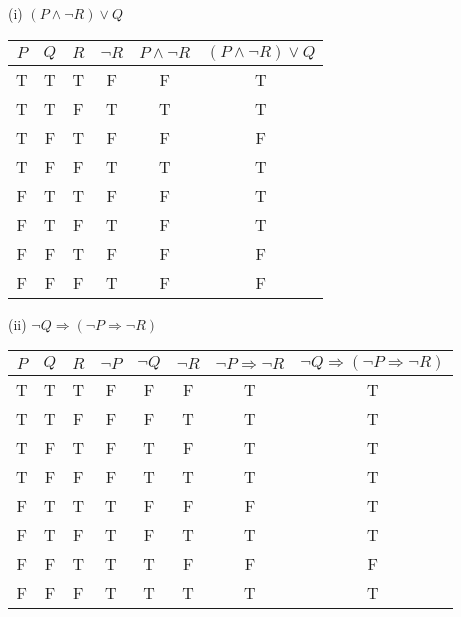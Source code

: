 \documentclass{article}
\begin{document}
(i) $(P \land \neg R) \lor Q$\\
\begin{tabular}{|c|c|c|c|c|c|}
    \hline
    $P$ & $Q$ & $R$ & $\neg R$ & $ P \land \neg R$ & $(P \land \neg R) \lor Q$ \\
    \hline
    T   & T   & T   & F        & F                 & T                         \\
    T   & T   & F   & T        & T                 & T                         \\
    T   & F   & T   & F        & F                 & F                         \\
    T   & F   & F   & T        & T                 & T                         \\
    F   & T   & T   & F        & F                 & T                         \\
    F   & T   & F   & T        & F                 & T                         \\
    F   & F   & T   & F        & F                 & F                         \\
    F   & F   & F   & T        & F                 & F                         \\
    \hline
\end{tabular}

(ii) $\neg Q \Rightarrow (\neg P \Rightarrow \neg R)$\\
\begin{tabular}{|c|c|c|c|c|c|c|c|}
    \hline
    $P$ & $Q$ & $R$ & $\neg P $ & $\neg Q$ & $\neg R$ & $\neg P \Rightarrow \neg R $ & $\neg Q \Rightarrow (\neg P \Rightarrow \neg R)$ \\
    \hline
    T   & T   & T   & F         & F        & F        & T                            & T                                                \\
    T   & T   & F   & F         & F        & T        & T                            & T                                                \\
    T   & F   & T   & F         & T        & F        & T                            & T                                                \\
    T   & F   & F   & F         & T        & T        & T                            & T                                                \\
    F   & T   & T   & T         & F        & F        & F                            & T                                                \\
    F   & T   & F   & T         & F        & T        & T                            & T                                                \\
    F   & F   & T   & T         & T        & F        & F                            & F                                                \\
    F   & F   & F   & T         & T        & T        & T                            & T                                                \\
    \hline
\end{tabular}
\end{document}
